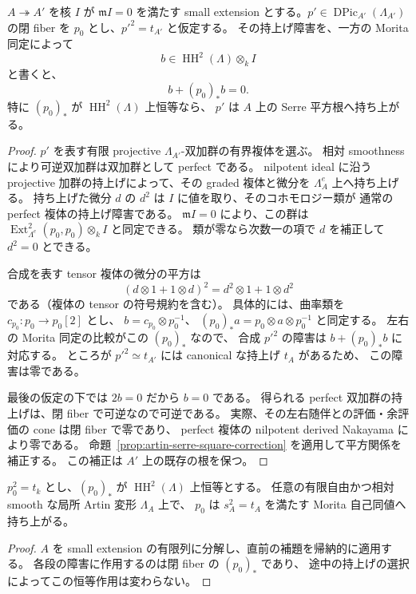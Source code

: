 \begin{lemma}[合成と持上げ障害]
\label{lem:root-obstruction-composition}
$A\twoheadrightarrow A'$ を核 $I$ が $\mathfrak m I=0$ を満たす
small extension とする。$p'\in\operatorname{DPic}_{A'}(\Lambda_{A'})$
の閉 fiber を $p_0$ とし、$p'^2=t_{A'}$ と仮定する。
その持上げ障害を、一方の Morita 同定によって
\[
 b\in\operatorname{HH}^2(\Lambda)\otimes_kI
\]
と書くと、
\[
 b+(p_0)_*b=0.
\]
特に $(p_0)_*$ が $\operatorname{HH}^2(\Lambda)$ 上恒等なら、
$p'$ は $A$ 上の Serre 平方根へ持ち上がる。
\end{lemma}
\begin{proof}
$p'$ を表す有限 projective $\Lambda_{A'}$-双加群の有界複体を選ぶ。
相対 smoothness により可逆双加群は双加群として perfect である。
nilpotent ideal に沿う projective 加群の持上げによって、その graded
複体と微分を $\Lambda_A^e$ 上へ持ち上げる。
持ち上げた微分 $d$ の $d^2$ は $I$ に値を取り、そのコホモロジー類が
通常の perfect 複体の持上げ障害である。
$\mathfrak m I=0$ により、この群は
$\operatorname{Ext}^2_{\Lambda^e}(p_0,p_0)\otimes_kI$ と同定できる。
類が零なら次数一の項で $d$ を補正して $d^2=0$ とできる。

合成を表す tensor 複体の微分の平方は
\[
 (d\otimes1+1\otimes d)^2=d^2\otimes1+1\otimes d^2
\]
である（複体の tensor の符号規約を含む）。
具体的には、曲率類を $c_{p_0}:p_0\to p_0[2]$ とし、
$b=c_{p_0}\otimes p_0^{-1}$、
$(p_0)_*a=p_0\otimes a\otimes p_0^{-1}$ と同定する。
左右の Morita 同定の比較がこの $(p_0)_*$ なので、
合成 $p'^2$ の障害は $b+(p_0)_*b$ に対応する。
ところが $p'^2\simeq t_{A'}$ には canonical な持上げ $t_A$ があるため、
この障害は零である。

最後の仮定の下では $2b=0$ だから $b=0$ である。
得られる perfect 双加群の持上げは、閉 fiber で可逆なので可逆である。
実際、その左右随伴との評価・余評価の cone は閉 fiber で零であり、
perfect 複体の nilpotent derived Nakayama により零である。
命題~\ref{prop:artin-serre-square-correction} を適用して平方関係を補正する。
この補正は $A'$ 上の既存の根を保つ。
\end{proof}

\begin{corollary}
\label{cor:hhtrivial-root-artin}
$p_0^2=t_k$ とし、$(p_0)_*$ が $\operatorname{HH}^2(\Lambda)$ 上恒等とする。
任意の有限自由かつ相対 smooth な局所 Artin 変形 $\Lambda_A$ 上で、
$p_0$ は $s_A^2=t_A$ を満たす Morita 自己同値へ持ち上がる。
\end{corollary}
\begin{proof}
$A$ を small extension の有限列に分解し、直前の補題を帰納的に適用する。
各段の障害に作用するのは閉 fiber の $(p_0)_*$ であり、
途中の持上げの選択によってこの恒等作用は変わらない。
\end{proof}

